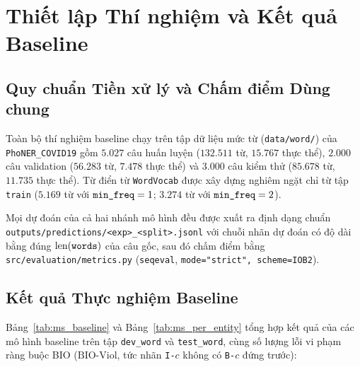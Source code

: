 \documentclass[11pt,a4paper,twocolumn]{article}
\begin{document}
\section{Thiết lập Thí nghiệm và Kết quả Baseline}

\subsection{Quy chuẩn Tiền xử lý và Chấm điểm Dùng chung}
Toàn bộ thí nghiệm baseline chạy trên tập dữ liệu mức từ (\texttt{data/word/}) của \texttt{PhoNER\_COVID19} \citep{truong-etal-2021-covid} gồm $5.027$ câu huấn luyện ($132.511$ từ, $15.767$ thực thể), $2.000$ câu validation ($56.283$ từ, $7.478$ thực thể) và $3.000$ câu kiểm thử ($85.678$ từ, $11.735$ thực thể). Từ điển từ \texttt{WordVocab} được xây dựng nghiêm ngặt chỉ từ tập \texttt{train} ($5.169$ từ với $\text{\texttt{min\_freq}}=1$; $3.274$ từ với $\text{\texttt{min\_freq}}=2$).

Mọi dự đoán của cả hai nhánh mô hình đều được xuất ra định dạng chuẩn \texttt{outputs/predictions/<exp>\_<split>.jsonl} với chuỗi nhãn dự đoán có độ dài bằng đúng $\text{len}(\text{\texttt{words}})$ của câu gốc, sau đó chấm điểm bằng \texttt{src/evaluation/metrics.py} (\texttt{seqeval}, \texttt{mode="strict", scheme=IOB2}).

\subsection{Kết quả Thực nghiệm Baseline}
Bảng~\ref{tab:ms_baseline} và Bảng~\ref{tab:ms_per_entity} tổng hợp kết quả của các mô hình baseline trên tập \texttt{dev\_word} và \texttt{test\_word}, cùng số lượng lỗi vi phạm ràng buộc BIO ($\text{BIO-Viol}$, tức nhãn \texttt{I-}$c$ không có \texttt{B-}$c$ đứng trước):
\end{document}

